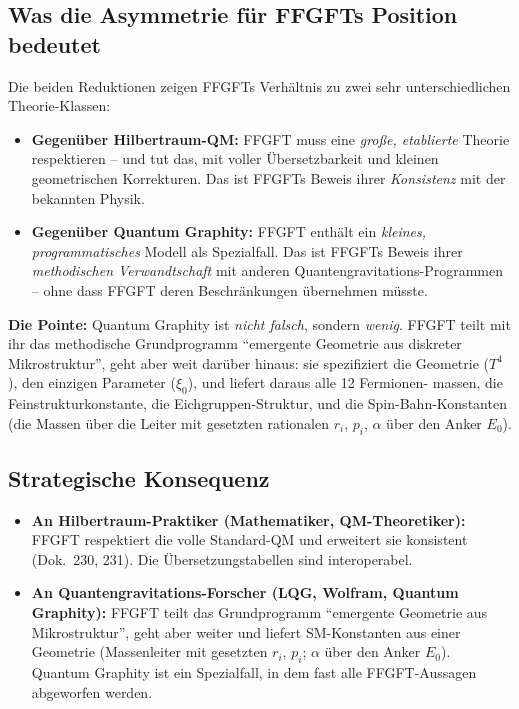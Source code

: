 \subsection{Was die Asymmetrie für FFGFTs Position bedeutet}

Die beiden Reduktionen zeigen FFGFTs Verhältnis zu zwei sehr
unterschiedlichen Theorie-Klassen:

\begin{itemize}[leftmargin=2em,itemsep=2pt,topsep=2pt]
  \item \textbf{Gegenüber Hilbertraum-QM:} FFGFT muss eine
        \emph{große, etablierte} Theorie respektieren -- und tut
        das, mit voller Übersetzbarkeit und kleinen geometrischen
        Korrekturen. Das ist FFGFTs Beweis ihrer
        \emph{Konsistenz} mit der bekannten Physik.

  \item \textbf{Gegenüber Quantum Graphity:} FFGFT enthält ein
        \emph{kleines, programmatisches} Modell als Spezialfall.
        Das ist FFGFTs Beweis ihrer \emph{methodischen Verwandtschaft}
        mit anderen Quantengravitations-Programmen -- ohne dass FFGFT
        deren Beschränkungen übernehmen müsste.
\end{itemize}

\textbf{Die Pointe:} Quantum Graphity ist \emph{nicht falsch}, sondern
\emph{wenig}. FFGFT teilt mit ihr das methodische Grundprogramm
\enquote{emergente Geometrie aus diskreter Mikrostruktur}, geht aber
weit darüber hinaus: sie spezifiziert die Geometrie ($T^4$), den
einzigen Parameter ($\xi_0$), und liefert daraus alle 12 Fermionen-
massen, die Feinstrukturkonstante, die Eichgruppen-Struktur, und die
Spin-Bahn-Konstanten (die Massen über die Leiter mit gesetzten
rationalen $r_i$, $p_i$, $\alpha$ über den Anker $E_0$).

\subsection{Strategische Konsequenz}

\begin{itemize}[leftmargin=2em,itemsep=2pt,topsep=2pt]
  \item \textbf{An Hilbertraum-Praktiker (Mathematiker,
        QM-Theoretiker):} FFGFT respektiert die volle Standard-QM
        und erweitert sie konsistent (Dok.~230, 231). Die
        Übersetzungstabellen sind interoperabel.

  \item \textbf{An Quantengravitations-Forscher (LQG, Wolfram,
        Quantum Graphity):} FFGFT teilt das Grundprogramm
        \enquote{emergente Geometrie aus Mikrostruktur}, geht aber
        weiter und liefert SM-Konstanten aus einer Geometrie
        (Massenleiter mit gesetzten $r_i$, $p_i$; $\alpha$ über den
        Anker $E_0$). Quantum
        Graphity ist ein Spezialfall, in dem fast alle FFGFT-Aussagen
        abgeworfen werden.
\end{itemize}

